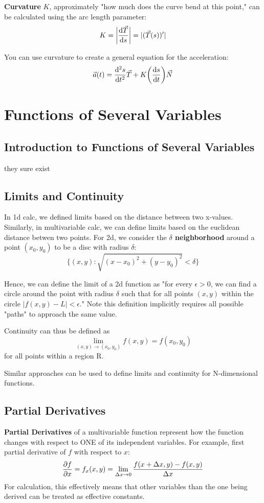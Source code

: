 \documentclass{article}
\begin{document}
\textbf{Curvature} $K$, approximately "how much does the curve bend at this point," can be calculated using the arc length parameter:
\[K = \bigg| \odv{\vec{T}}{s} \bigg| = |(\vec{T}(s))'|\]

You can use curvature to create a general equation for the acceleration:
\[\vec{a}(t) = \odv[2]{s}{t} \vec{T} + K\bigg( \odv{s}{t} \bigg) \vec{N}\]

\section{Functions of Several Variables}
\subsection{Introduction to Functions of Several Variables}
they sure exist

\subsection{Limits and Continuity}
In 1d calc, we defined limits based on the distance between two x-values.
Similarly, in multivariable calc, we can define limits based on the euclidean distance betwen two points.
For 2d, we consider the \textbf{$\delta$ neighborhood} around a point $(x_0, y_0)$ to be a disc with radius $\delta$:
\[\{(x,y) : \sqrt{(x - x_0)^2 + (y - y_0)^2} < \delta \}\]

Hence, we can define the limit of a 2d function as "for every $\epsilon > 0$, we can find a circle around the point with radius $\delta$ such that for all points $(x, y)$ within the circle $|f(x,y) - L| < \epsilon$."
Note this definition implicitly requires all possible "paths" to approach the same value.

Continuity can thus be defined as
\[\lim_{(x, y) \to (x_0, y_0)} f(x,y) = f(x_0, y_0)\]
for all points within a region R.

Similar approaches can be used to define limits and continuity for N-dimensional functions.

\subsection{Partial Derivatives}
\textbf{Partial Derivatives} of a multivariable function represent how the function changes with respect to ONE of its independent variables.
For example, first partial derivative of $f$ with respect to $x$:
\[\pdv{f}{x} = f_x(x,y) = \lim_{\Delta x \to 0} \frac{f(x + \Delta x, y) - f(x, y)}{\Delta x}\]
For calculation, this effectively means that other variables than the one being derived can be treated as effective constants.
\end{document}
